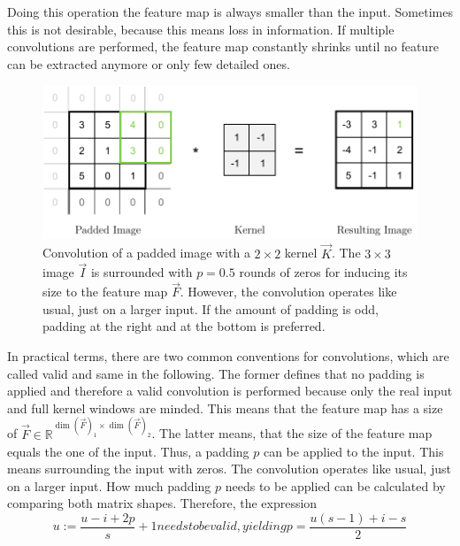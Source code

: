 Doing this operation the feature map is always smaller than the input.
Sometimes this is not desirable, because this means loss in information.
If multiple convolutions are performed, the feature map constantly shrinks until no feature can be extracted anymore or only few detailed ones.
\begin{figure}
	\centering
	\includegraphics{images/convolution_padding.pdf}
	\caption[Convolution of a padded image with a kernel]{Convolution of a padded image with a $2 \times 2$ kernel $\vec{K}$. The $3 \times 3$ image $\vec{I}$ is surrounded with $p=0.5$ rounds of zeros for inducing its size to the feature map $\vec{F}$. However, the convolution operates like usual, just on a larger input. If the amount of padding is odd, padding at the right and at the bottom is preferred.}
	\label{fig:convolution-padding}
\end{figure}
In practical terms, there are two common conventions for convolutions, which are called valid and same in the following.
The former defines that no padding is applied and therefore a valid convolution is performed because only the real input and full kernel windows are minded.
This means that the feature map has a size of $\vec{F} \in \mathbb{R}^{\dim(\vec{F})_1 \times \dim(\vec{F})_2}$.
The latter means, that the size of the feature map equals the one of the input.
Thus, a padding $p$ can be applied to the input.
This means surrounding the input with zeros.
The convolution operates like usual, just on a larger input.
How much padding $p$ needs to be applied can be calculated by comparing both matrix shapes.
Therefore, the expression
\begin{subequations}
	\begin{equation}
		u := \frac{u-i+2p}{s}+1
	\end{equation}
needs to be valid, yielding
\begin{equation}
	p = \frac{u(s-1)+i-s}{2}
\end{equation}
\end{subequations}
